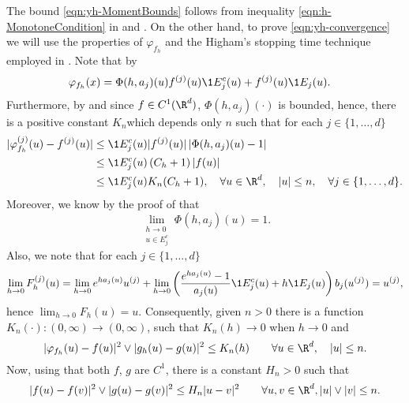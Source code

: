 \documentclass[3p]{elsarticle}
\theoremstyle{definition}
\theoremstyle{plain}%
\theoremstyle{remark}
\begin{document}
\begin{pf}
	The bound \eqref{eqn:yh-MomentBounds} follows from inequality \eqref{eqn:h-MonotoneCondition} in
	 and .
	On the other hand, to prove \eqref{eqn:yh-convergence} we will use the properties of 
	$\varphi_{f_h}$ and the Higham's stopping time technique employed in \cite[Thm 2.2]{Higham2002b}. 
	Note that by  
	\begin{align*}
		\varphi_{f_h}(x) 
			&= \Phi(h,a_j)(u) f^{(j)}(u) \1{E_j^c}(u) 
				+ f^{(j)}(u) \1{E_j}(u).
	\end{align*}
	Furthermore, by   and since $f \in C^1(\R^d)$,   $\Phi(h,a_j)(\cdot)$ is bounded,
	hence, there is a positive constant $K_n$which depends only $n$ such that for each $j\in \{1,\dots, d\}$
	\begin{align*}	
		|\varphi_{f_h}^{(j)}(u) - f^{(j)}(u)|
		&\leq
			\1{E_j^c}(u)
			|f^{(j)}(u)|
			\left|
				\Phi(h,a_j)(u) - 1
			\right| \notag \\
		&\leq
			\1{E_j^c}(u)
			\left(
				C_h + 1
			\right)
			|f(u)|	 \notag \\
		&\leq
		\1{E_j^c}(u) K_n(C_h+1), \quad \forall u \in \R^d, \quad |u|\leq n,  \quad \forall j\in \{1,\dots, d\}.
	\end{align*}
	Moreover, we know by the proof of  that
	\begin{equation*}
	 \lim_{
	 	\substack{
		 	h\to 0 \\
		 	u\in E_j^c	
	 	}
	 }
	 \Phi(h,a_j)(u) = 1.	 	
	\end{equation*}
	Also, we note that for each $j \in \{1, \dots , d\}$
	\begin{equation*}
	\lim_{h \to 0} F_h^{(j)}(u)
		=
		\lim_{h \to 0}
			e^{ha_j(u)} u^{(j)} + 
		\lim_{h \to 0}
			\left(
				\frac{e^{ha_j(u)}-1}{a_j(u)}
				\1{E_j^c}(u)
				+h \1{E_j}(u)
			\right)
			b_j(u^{(j)}) 
		= u^{(j)},
	\end{equation*}
	hence
	$%
		\displaystyle
		\lim_{h\to 0} F_h(u)=u.
	$ %
	Consequently, given $n>0$ there is  a function $K_n(\cdot):(0,\infty)\to (0,\infty)$, such that
	$K_n(h)\to 0$ when $h \to 0$ and
	\begin{equation}\label{eqn:PhihGhKRhBound}
		|\varphi_{f_h}(u)-f(u)|^2 \vee |g_h(u)-g(u)|^2
		\leq K_n(h) \qquad \forall u\in \R^d, \quad |u| \leq n.
	\end{equation}
	Now, using that both $f$, $g$ are $C^{1}$, there is  a constant $H_n>0$ such that
	\begin{equation}\label{eqn:f-gHRBound}
		|f(u)-f(v)|^2 \vee |g(u)-g(v)|^2
		\leq H_n |u-v|^2\qquad \forall u,v \in \R^d, |u|\vee |v| \leq n.
	\end{equation}
	

\end{pf}
\end{document}
